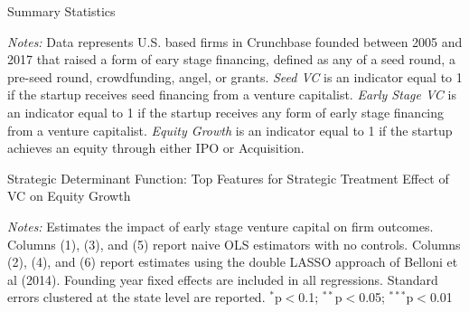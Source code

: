 \documentclass[11pt]{article}
\begin{document}
\begin{center}

\clearpage
\newpage

\begin{table}[htp]
\begin{center}
\caption{Summary Statistics}


    \begin{threeparttable}


\begin{tablenotes}
\item {\footnotesize
\emph{Notes:} Data represents U.S. based firms in Crunchbase founded between 2005 and 2017 that raised a form of eary stage financing, defined as any of a seed round, a pre-seed round, crowdfunding, angel, or grants. \emph{Seed VC} is an indicator equal to 1 if the startup receives seed financing from a venture capitalist. \emph{Early Stage VC} is an indicator equal to 1 if the startup receives any form of early stage financing from a venture capitalist. \emph{Equity Growth} is an indicator equal to 1 if the startup achieves an equity through either IPO or Acquisition.}
\end{tablenotes}
  \end{threeparttable}

\end{center}
\end{table}



\begin{table}[htp]
\begin{center}
\caption{Strategic Determinant Function: Top Features for Strategic Treatment Effect of VC on Equity Growth}

    \begin{threeparttable}


  \begin{tablenotes}
      \item {\footnotesize
        \emph{Notes:} Estimates the impact of early stage venture capital on firm
  outcomes. Columns (1), (3), and (5) report naive OLS estimators with no
  controls. Columns (2), (4), and (6) report estimates using the double LASSO
  approach of Belloni et al (2014). Founding year fixed effects are included in all regressions. Standard errors clustered at the state level are reported. $^{*}$p$<$0.1; $^{**}$p$<$0.05; $^{***}$p$<$0.01
        }
  		\end{tablenotes}
  		\end{threeparttable}


\end{center}
\end{table}
\end{center}
\end{document}
